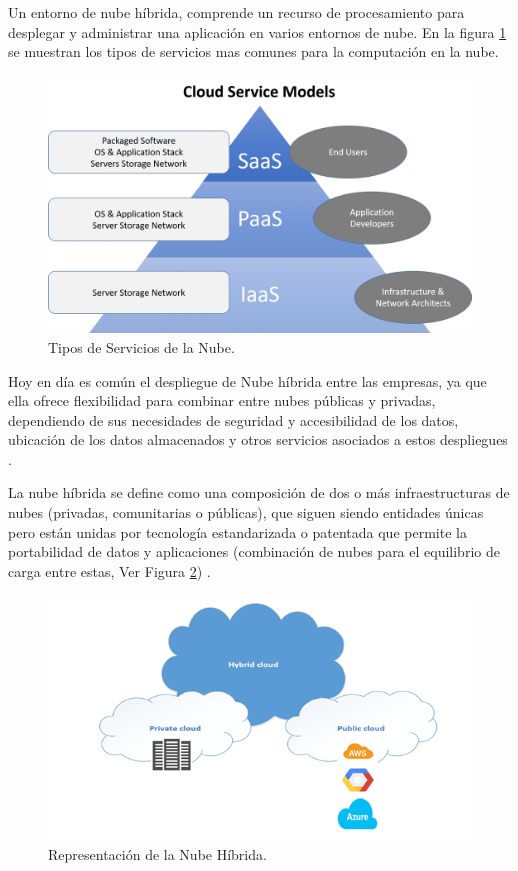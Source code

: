 \par Un entorno de nube híbrida, comprende un recurso de procesamiento para desplegar y administrar una aplicación en varios entornos de nube. En la figura \ref{fig:cloud01} se muestran los tipos de servicios mas comunes para la computación en la nube.\\
\begin{figure}[htpb!]
	\centering
	\includegraphics[width=0.8\columnwidth]{images/cloud01.png}
	\caption{Tipos de Servicios de la Nube.}
	\label{fig:cloud01}
\end{figure}

\par Hoy en día es común el despliegue de  Nube híbrida entre las empresas, ya que ella ofrece flexibilidad para combinar entre nubes públicas y privadas, dependiendo de sus necesidades de seguridad y accesibilidad de los datos, ubicación de los datos almacenados y otros servicios asociados a estos despliegues \cite{LIB21}.\\

\par La nube híbrida se define como una composición de dos o más infraestructuras de nubes (privadas, comunitarias o públicas), que siguen siendo entidades únicas pero están unidas por tecnología estandarizada o patentada que permite la portabilidad de datos y aplicaciones (combinación de nubes para el equilibrio de carga entre estas, Ver Figura \ref{fig:cloud02}) \cite{LIB21}.\\

\begin{figure}[htpb!]
	\centering
	\includegraphics[width=0.8\columnwidth]{images/cloud02.png}
	\caption{Representación de la Nube Híbrida.}
	\label{fig:cloud02}
\end{figure}

